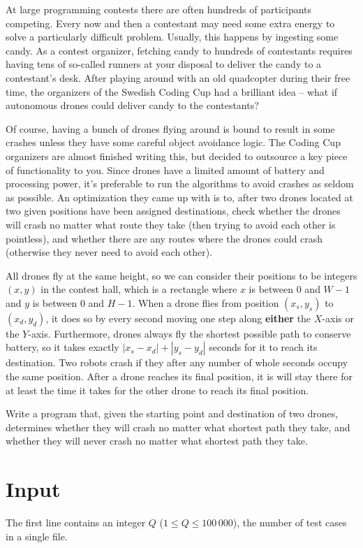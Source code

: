 At large programming contests there are often hundreds of participants competing.
Every now and then a contestant may need some extra energy to solve a particularly difficult problem.
Usually, this happens by ingesting some candy.
As a contest organizer, fetching candy to hundreds of contestants requires having tens of so-called runners at your disposal to deliver the candy to a contestant's desk.
After playing around with an old quadcopter during their free time, the organizers of the Swedish Coding Cup had a brilliant idea -- what if autonomous drones could deliver candy to the contestants?

Of course, having a bunch of drones flying around is bound to result in some crashes unless they have some careful object avoidance logic.
The Coding Cup organizers are almost finished writing this, but decided to outsource a key piece of functionality to you.
Since drones have a limited amount of battery and processing power, it's preferable to run the algorithms to avoid crashes as seldom as possible.
An optimization they came up with is to, after two drones located at two given positions have been assigned destinations, check whether the drones will crash no matter what route they take (then trying to avoid each other is pointless), and whether there are any routes where the drones could crash (otherwise they never need to avoid each other).

All drones fly at the same height, so we can consider their positions to be integers $(x, y)$ in the contest hall, which is a rectangle where $x$ is between $0$ and $W - 1$ and $y$ is between $0$ and $H - 1$.
When a drone flies from position $(x_s, y_s)$ to $(x_d, y_d)$, it does so by every second moving one step along \textbf{either} the $X$-axis or the $Y$-axis.
Furthermore, drones always fly the shortest possible path to conserve battery, so it takes exactly $|x_s - x_d| + |y_s - y_d|$ seconds for it to reach its destination.
Two robots crash if they after any number of whole seconds occupy the same position.
After a drone reaches its final position, it is will stay there for at least the time it takes for the other drone to reach its final position.

Write a program that, given the starting point and destination of two drones, determines whether they will crash no matter what shortest path they take, and whether they will never crash no matter what shortest path they take.

\section*{Input}
The first line contains an integer $Q$ ($1 \le Q \le 100\,000$), the number of test cases in a single file.

